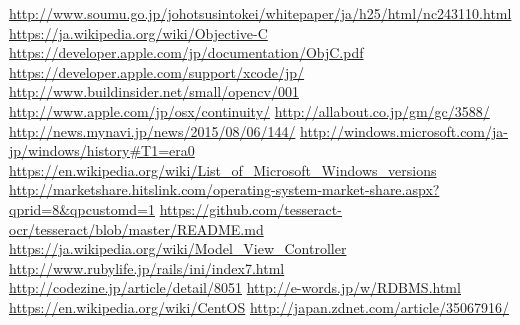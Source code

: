 \def\line{-\hspace*{-.7zw}-}

\begin{thebibliography}{99}

\url{http://www.soumu.go.jp/johotsusintokei/whitepaper/ja/h25/html/nc243110.html}
\url{https://ja.wikipedia.org/wiki/Objective-C}
\url{https://developer.apple.com/jp/documentation/ObjC.pdf}
\url{https://developer.apple.com/support/xcode/jp/}
\url{http://www.buildinsider.net/small/opencv/001}
\url{http://www.apple.com/jp/osx/continuity/}
\url{http://allabout.co.jp/gm/gc/3588/}
\url{http://news.mynavi.jp/news/2015/08/06/144/}
\url{http://windows.microsoft.com/ja-jp/windows/history#T1=era0}
\url{https://en.wikipedia.org/wiki/List_of_Microsoft_Windows_versions}
\url{http://marketshare.hitslink.com/operating-system-market-share.aspx?qprid=8&qpcustomd=1}
\url{https://github.com/tesseract-ocr/tesseract/blob/master/README.md}
\url{https://ja.wikipedia.org/wiki/Model_View_Controller}
\url{http://www.rubylife.jp/rails/ini/index7.html}
\url{http://codezine.jp/article/detail/8051}
\url{http://e-words.jp/w/RDBMS.html}
\url{https://en.wikipedia.org/wiki/CentOS}
\url{http://japan.zdnet.com/article/35067916/}

\end{thebibliography}